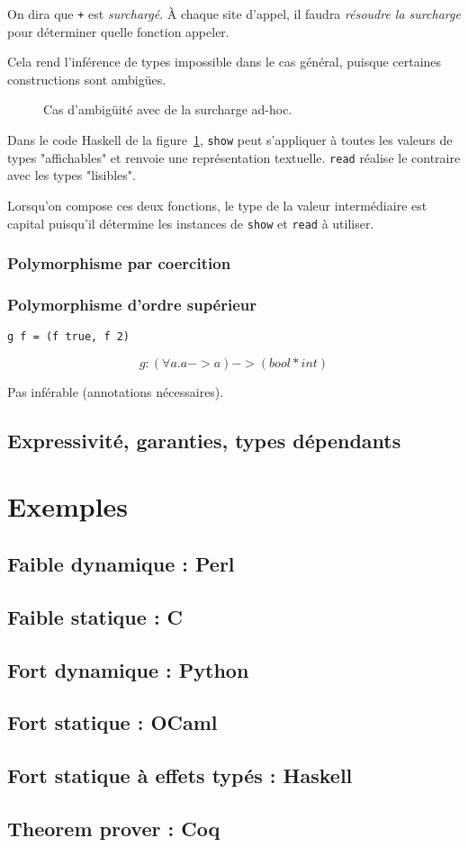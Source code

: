 On dira que \texttt{+} est \emph{surchargé}. À chaque site d'appel, il faudra
\emph{résoudre la surcharge} pour déterminer quelle fonction appeler.

Cela rend l'inférence de types 
impossible dans le cas général, puisque certaines constructions sont ambigües.

\begin{figure}
  \caption{Cas d'ambigüité avec de la surcharge ad-hoc.}
  \label{fig:showread}
\end{figure}

Dans le code Haskell de la figure~\ref{fig:showread}, \texttt{show} peut
s'appliquer à toutes les valeurs de types "affichables" et renvoie une
représentation textuelle. \texttt{read} réalise le contraire avec les types
"lisibles".

Lorsqu'on compose ces deux fonctions, le type de la valeur intermédiaire est
capital puisqu'il détermine les instances de \texttt{show} et \texttt{read} à
utiliser.

\subsubsection{Polymorphisme par coercition}

\subsubsection{Polymorphisme d'ordre supérieur}

\begin{verbatim}
g f = (f true, f 2)
\end{verbatim}

\[
g : (\forall a . a -> a) -> (bool * int)
\]

Pas inférable (annotations nécessaires).

\subsection{Expressivité, garanties, types dépendants}

\section{Exemples}

\subsection{Faible dynamique : Perl}
\subsection{Faible statique : C}
\subsection{Fort dynamique : Python}
\subsection{Fort statique : OCaml}
\subsection{Fort statique à effets typés : Haskell}
\subsection{Theorem prover : Coq}
